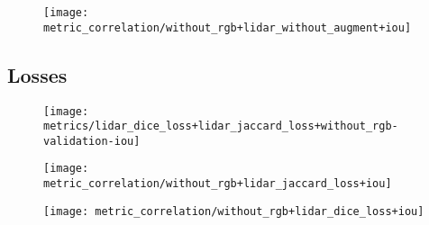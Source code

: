 \begin{figure}[H]
  \centering
  \texttt{[image: metric\_correlation/without\_rgb+lidar\_without\_augment+iou]}
\end{figure}

\subsection{Losses}

\begin{figure}[H]
  \centering
  \texttt{[image: metrics/lidar\_dice\_loss+lidar\_jaccard\_loss+without\_rgb-validation-iou]}
\end{figure}

\begin{figure}[H]
  \centering
  \texttt{[image: metric\_correlation/without\_rgb+lidar\_jaccard\_loss+iou]}
\end{figure}

\begin{figure}[H]
  \centering
  \texttt{[image: metric\_correlation/without\_rgb+lidar\_dice\_loss+iou]}
\end{figure}
